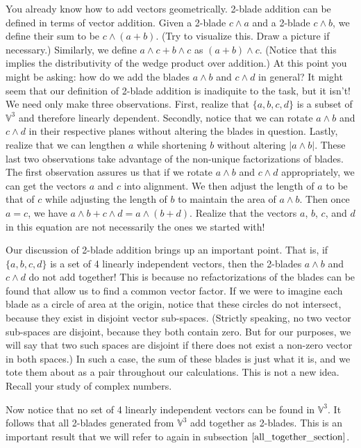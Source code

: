 \documentclass{article}
\newcommand{\V}{\mathbb{V}}
\begin{document}
You already know how to add vectors geometrically.  2-blade addition
can be defined in terms of vector addition.  Given a 2-blade $c\wedge a$
and a 2-blade $c\wedge b$, we define their sum to be $c\wedge (a+b)$.
(Try to visualize this.  Draw a picture if necessary.)
Similarly, we define $a\wedge c+b\wedge c$ as $(a+b)\wedge c$.  (Notice
that this implies the distributivity of the wedge product over addition.)
At this point you might be asking: how do we add the blades
$a\wedge b$ and $c\wedge d$ in general?  It might seem that our definition
of 2-blade addition is inadiquite to the task, but it isn't!
We need only make three observations.  First, realize that $\{a,b,c,d\}$
is a subset of $\V^3$ and therefore linearly dependent.
Secondly, notice that we can rotate $a\wedge b$
and $c\wedge d$ in their respective planes without altering the
blades in question.  Lastly, realize that
we can lengthen $a$ while shortening $b$ without altering $|a\wedge b|$.
These last two observations take advantage of the non-unique factorizations
of blades.  The first observation assures us that if we rotate
$a\wedge b$ and $c\wedge d$ appropriately, we can get the vectors
$a$ and $c$ into alignment.  We then adjust the length of $a$ to be
that of $c$ while adjusting the length of $b$ to maintain the
area of $a\wedge b$.  Then once $a=c$, we have $a\wedge b+c\wedge d=a\wedge(b+d)$.
Realize that the vectors $a$, $b$, $c$, and $d$ in this equation are not
necessarily the ones we started with!

Our discussion of 2-blade addition brings up an important point.
That is, if $\{a,b,c,d\}$ is a set of 4 linearly independent vectors,
then the 2-blades $a\wedge b$ and $c\wedge d$ do not add together!
This is because no refactorizations of the blades can be found that
allow us to find a common vector factor.  If we were to imagine
each blade as a circle of area at the origin, notice that these circles do not
intersect, because they exist in disjoint vector sub-spaces.
(Strictly speaking, no two vector sub-spaces are disjoint, because
they both contain zero.  But for our purposes, we will say that two such spaces are disjoint
if there does not exist a non-zero vector in both spaces.)
In such a case, the sum of these blades is just what it is, and
we tote them about as a pair throughout our calculations.
This is not a new idea.  Recall your study of complex numbers.

Now notice that no set of 4 linearly independent vectors can
be found in $\V^3$.  It follows that all 2-blades generated from
$\V^3$ add together as 2-blades.  This is an important result that we will
refer to again in subsection $\eqref{all_together_section}$.
\end{document}
